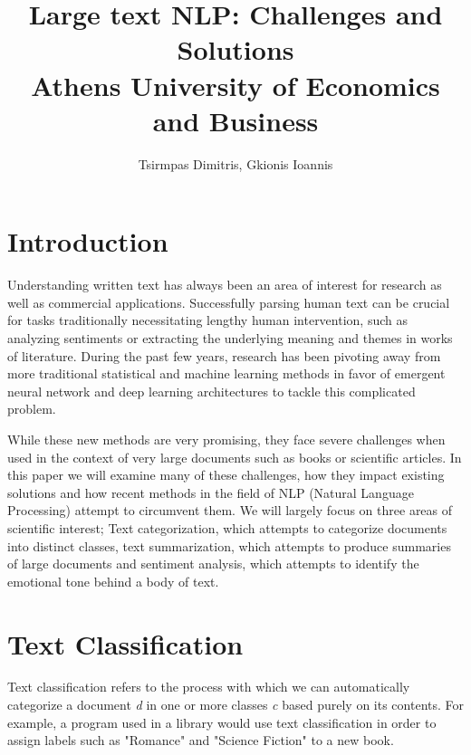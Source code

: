 \documentclass{article}
\title{Large text NLP: Challenges and Solutions\\\large Athens University of Economics and Business}
\author{Tsirmpas Dimitris, Gkionis Ioannis}
\begin{document}
	
	\begin{titlepage}
		\hypersetup{pageanchor=false} %
		\maketitle
	\end{titlepage}
	\hypersetup{pageanchor=true}
	
	\tableofcontents
	
	\section{Introduction}
	Understanding written text has always been an area of interest for research as well as commercial applications. Successfully parsing human text can be crucial for tasks traditionally necessitating lengthy human intervention, such as analyzing sentiments or extracting the underlying meaning and themes in works of literature. During the past few years, research has been pivoting away from more traditional statistical and machine learning methods in favor of emergent neural network and deep learning architectures to tackle this complicated problem. 
	
	While these new methods are very promising, they face severe challenges when used in the context of very large documents such as books or scientific articles. In this paper we will examine many of these challenges, how they impact existing solutions and how recent methods in the field of NLP (Natural Language Processing) attempt to circumvent them. We will largely focus on three areas of scientific interest; Text categorization, which attempts to categorize documents into distinct classes, text summarization, which attempts to produce summaries of large documents and sentiment analysis, which attempts to identify the emotional tone behind a body of text. 
	
	
	\section{Text Classification}
	Text classification refers to the process with which we can automatically categorize a document \textit{d} in one or more classes \textit{c} based purely on its contents. For example, a program used in a library would use text classification in order to assign labels such as "Romance" and "Science Fiction" to a new book.\par
	
\end{document}
